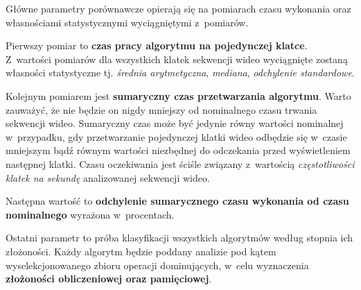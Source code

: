     Główne parametry porównawcze opierają się na pomiarach czasu wykonania oraz własnościami statystycznymi wyciągniętymi z~pomiarów.

    Pierwszy pomiar to \textbf{czas pracy algorytmu na pojedynczej klatce}. Z~wartości pomiarów dla wszystkich klatek sekwencji wideo wyciągnięte zostaną własności statystyczne tj. \textit{średnia arytmetyczna}, \textit{mediana}, \textit{odchylenie standardowe}.

    Kolejnym pomiarem jest \textbf{sumaryczny czas przetwarzania algorytmu}. Warto zauważyć, że nie będzie on nigdy mniejszy od nominalnego czasu trwania sekwencji wideo. Sumaryczny czas może być jedynie równy wartości nominalnej w~przypadku, gdy przetwarzanie pojedynczej klatki wideo odbędzie się w~czasie mniejszym bądź równym wartości niezbędnej do odczekania przed wyświetleniem następnej klatki. Czasu oczekiwania jest ściśle związany z~wartością \textit{częstotliwości klatek na sekundę} analizowanej sekwencji wideo.

    Następna wartość to \textbf{odchylenie sumarycznego czasu wykonania od czasu nominalnego} wyrażona w~procentach.

    Ostatni parametr to próba klasyfikacji wszystkich algorytmów według stopnia ich złożoności. Każdy algorytm będzie poddany analizie pod kątem wyselekcjonowanego zbioru operacji dominujących, w~celu wyznaczenia \textbf{złożoności obliczeniowej oraz pamięciowej}.